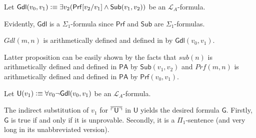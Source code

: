 \begin{dfn}
Let $\mathsf{Gdl}(v_0, v_1) \vcentcolon \equiv \exists v_2 (\mathsf{Prf}[v_2/v_1] \wedge \mathsf{Sub}(v_1,v_2))$ be an $\mathcal{L}_A$-formula.
\end{dfn}
Evidently, $\mathsf{Gdl}$ is a $\Sigma_1$-formula since $\mathsf{Prf}$ and $\mathsf{Sub}$ are $\Sigma_1$-formulas.

\begin{prop}
$\mathit{Gdl}(m,n)$ is arithmetically defined and defined in \PA by $\mathsf{Gdl}(v_0,v_1)$.
\end{prop}

Latter proposition can be easily shown by the facts that $\mathit{sub}(n)$ is arithmetically defined and defined in $\mathsf{PA}$ by $\mathsf{Sub}(v_1,v_2)$ and $\mathit{Prf}(m,n)$ is arithmetically defined and defined in $\mathsf{PA}$ by $\mathsf{Prf}(v_0,v_1)$.



\begin{dfn}
Let $\mathsf{U}(v_1) \vcentcolon \equiv \forall v_0  \lnot \mathsf{Gdl}(v_0,v_1)$ be an $\mathcal{L}_A$-formula.
\end{dfn}
The indirect substitution of $v_1$ for $\overline{\ulcorner \mathsf{U} \urcorner}$ in $\mathsf{U}$ yields the desired formula $\mathsf{G}$. Firstly, $\mathsf{G}$ is true if and only if it is unprovable. Secondly, it is a $\Pi_1$-sentence (and very long in its unabbreviated version).

